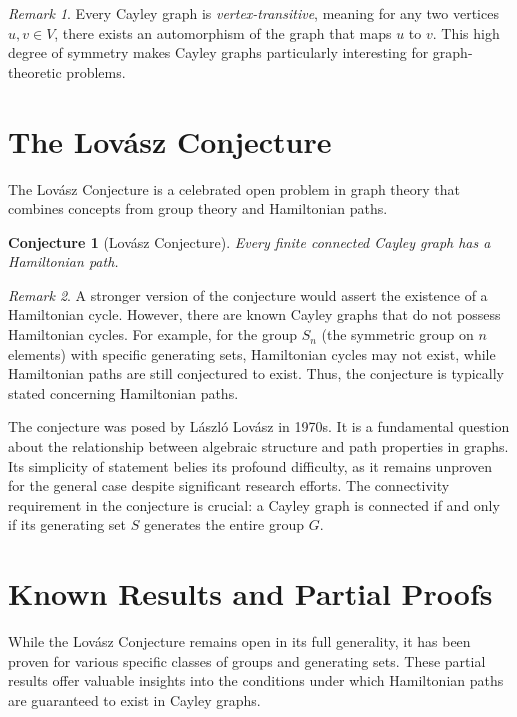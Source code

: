 \documentclass[12pt]{article}
\newtheorem{conjecture}{Conjecture}[section]
\theoremstyle{remark}
\newtheorem{remark}{Remark}[section]
\begin{document}
\begin{remark}
Every Cayley graph is \emph{vertex-transitive}, meaning for any two vertices $u, v \in V$, there exists an automorphism of the graph that maps $u$ to $v$. This high degree of symmetry makes Cayley graphs particularly interesting for graph-theoretic problems.
\end{remark}

\section{The Lovász Conjecture}
The Lovász Conjecture is a celebrated open problem in graph theory that combines concepts from group theory and Hamiltonian paths.

\begin{conjecture}[Lovász Conjecture]
Every finite connected Cayley graph has a Hamiltonian path.
\end{conjecture}

\begin{remark}
A stronger version of the conjecture would assert the existence of a Hamiltonian cycle. However, there are known Cayley graphs that do not possess Hamiltonian cycles. For example, for the group $S_n$ (the symmetric group on $n$ elements) with specific generating sets, Hamiltonian cycles may not exist, while Hamiltonian paths are still conjectured to exist. Thus, the conjecture is typically stated concerning Hamiltonian paths.
\end{remark}

The conjecture was posed by László Lovász in 1970s. It is a fundamental question about the relationship between algebraic structure and path properties in graphs. Its simplicity of statement belies its profound difficulty, as it remains unproven for the general case despite significant research efforts. The connectivity requirement in the conjecture is crucial: a Cayley graph is connected if and only if its generating set $S$ generates the entire group $G$.

\section{Known Results and Partial Proofs}
While the Lovász Conjecture remains open in its full generality, it has been proven for various specific classes of groups and generating sets. These partial results offer valuable insights into the conditions under which Hamiltonian paths are guaranteed to exist in Cayley graphs.
\end{document}
